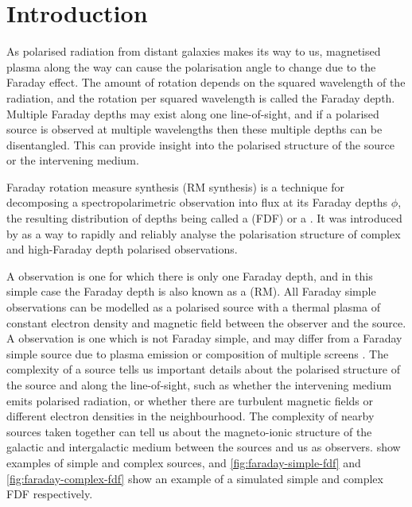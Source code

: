 \section{Introduction}
\label{sec:faraday-intro}

  As polarised radiation from distant galaxies makes its way to us, magnetised plasma along the way can cause the polarisation angle to change due to the Faraday effect. The amount of rotation depends on the squared wavelength of the radiation, and the rotation per squared wavelength is called the Faraday depth. Multiple Faraday depths may exist along one line-of-sight, and if a polarised source is observed at multiple wavelengths then these multiple depths can be disentangled. This can provide insight into the polarised structure of the source or the intervening medium.

  Faraday rotation measure synthesis (RM synthesis) is a technique for decomposing a spectropolarimetric observation into flux at its Faraday depths $\phi$, the resulting distribution of depths being called a  (FDF) or a . It was introduced by \citet{brentjens_faraday_2005} as a way to rapidly and reliably analyse the polarisation structure of complex and high-Faraday depth polarised observations.

  A  observation is one for which there is only one Faraday depth, and in this simple case the Faraday depth is also known as a  (RM). All Faraday simple observations can be modelled as a polarised source with a thermal plasma of constant electron density and magnetic field \citep[a `Faraday screen';][]{brentjens_faraday_2005,anderson_broadband_2015} between the observer and the source. A  observation is one which is not Faraday simple, and may differ from a Faraday simple source due to plasma emission or composition of multiple screens \citep{brentjens_faraday_2005}. The complexity of a source tells us important details about the polarised structure of the source and along the line-of-sight, such as whether the intervening medium emits polarised radiation, or whether there are turbulent magnetic fields or different electron densities in the neighbourhood. The complexity of nearby sources taken together can tell us about the magneto-ionic structure of the galactic and intergalactic medium between the sources and us as observers. \citet{osullivan_broad-band_2017} show examples of simple and complex sources, and \autoref{fig:faraday-simple-fdf} and \autoref{fig:faraday-complex-fdf} show an example of a simulated simple and complex FDF respectively.

